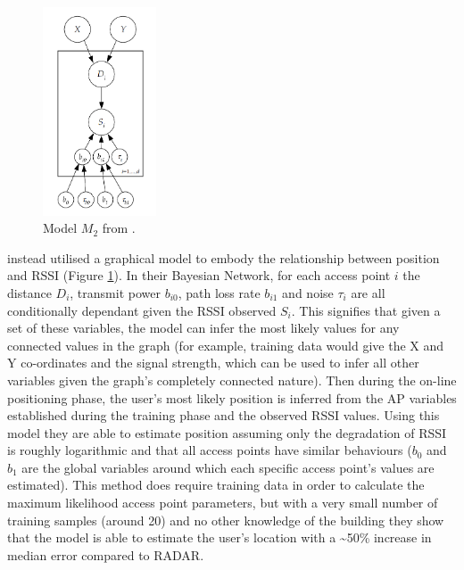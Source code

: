 \documentclass{UoYCSproject}
\begin{document}
                \begin{figure}[h]
                    \label{fig:m2}
                    \centering
                    \includegraphics[width=0.3\textwidth]{Model_M2.png}
                    \caption{Model $M_2$ from \citet{madigan2005bayesian}.}
                \end{figure}
                
                \citet{madigan2005bayesian} instead utilised a graphical model to embody the relationship between position and RSSI (Figure \ref{fig:m2}). In their Bayesian Network, for each access point $i$ the distance $D_i$, transmit power $b_{i0}$, path loss rate $b_{i1}$ and noise $\tau_i$ are all conditionally dependant given the RSSI observed $S_i$. This signifies that given a set of these variables, the model can infer the most likely values for any connected values in the graph (for example, training data would give the X and Y co-ordinates and the signal strength, which can be used to infer all other variables given the graph's completely connected nature). Then during the on-line positioning phase, the user's most likely position is inferred from the AP variables established during the training phase and the observed RSSI values. Using this model they are able to estimate position assuming only the degradation of RSSI is roughly logarithmic and that all access points have similar behaviours ($b_0$ and $b_1$ are the global variables around which each specific access point's values are estimated). This method does require training data in order to calculate the maximum likelihood access point parameters, but with a very small number of training samples (around 20) and no other knowledge of the building they show that the model is able to estimate the user's location with a \textasciitilde50\% increase in median error compared to RADAR.
                
\end{document}
